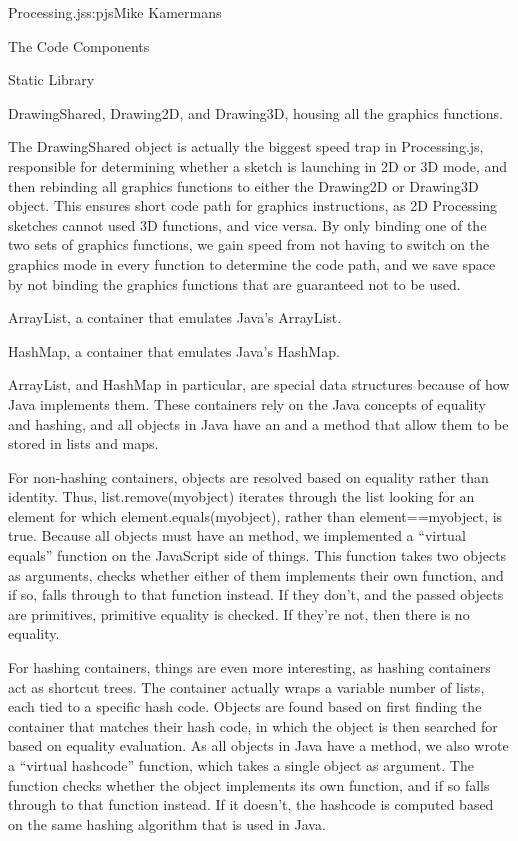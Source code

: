 \begin{aosachapter}{Processing.js}{s:pjs}{Mike Kamermans}
\begin{aosasect1}{The Code Components}
\begin{aosasect2}{Static Library}
\begin{aosaitemize}
\item DrawingShared, Drawing2D, and Drawing3D, housing all the
  graphics functions.

The DrawingShared object is actually the biggest speed trap in
Processing.js, responsible for determining whether a sketch is
launching in 2D or 3D mode, and then rebinding all graphics functions
to either the Drawing2D or Drawing3D object. This ensures short code
path for graphics instructions, as 2D Processing sketches cannot used
3D functions, and vice versa. By only binding one of the two sets of
graphics functions, we gain speed from not having to switch on the
graphics mode in every function to determine the code path, and we
save space by not binding the graphics functions that are guaranteed
not to be used.

\item ArrayList, a container that emulates Java's ArrayList.

\item HashMap, a container that emulates Java's HashMap.

ArrayList, and HashMap in particular, are special data structures
because of how Java implements them. These containers rely on the Java
concepts of equality and hashing, and all objects in Java have an
 and a  method that allow them to be
stored in lists and maps.

For non-hashing containers, objects are resolved based on equality
rather than identity. Thus, list.remove(myobject) iterates through the
list looking for an element for which element.equals(myobject), rather
than element==myobject, is true. Because all objects must have an
 method, we implemented a ``virtual equals'' function on
the JavaScript side of things. This function takes two objects as
arguments, checks whether either of them implements their own
 function, and if so, falls through to that function
instead. If they don't, and the passed objects are primitives,
primitive equality is checked. If they're not, then there is no
equality.

For hashing containers, things are even more interesting, as hashing
containers act as shortcut trees. The container actually wraps a
variable number of lists, each tied to a specific hash code. Objects
are found based on first finding the container that matches their hash
code, in which the object is then searched for based on equality
evaluation. As all objects in Java have a  method, we also
wrote a ``virtual hashcode'' function, which takes a single object as
argument. The function checks whether the object implements its own
 function, and if so falls through to that function
instead. If it doesn't, the hashcode is computed based on the same
hashing algorithm that is used in Java.


\end{aosaitemize}
\end{aosasect2}
\end{aosasect1}
\end{aosachapter}
